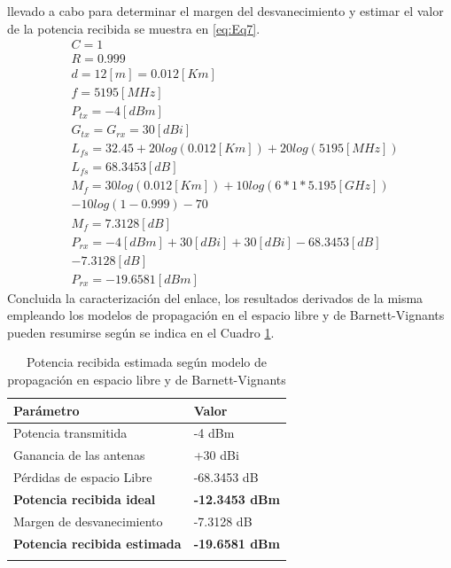 \documentclass[conference]{IEEEtran}
\begin{document}
llevado a cabo para determinar el margen del desvanecimiento y estimar el valor de la potencia recibida se muestra en \ref{eq:Eq7}.
\begin{equation}
    \label{eq:Eq7}
    \begin{aligned}
        &C = 1\\
        &R = 0.999\\
        &d = 12[m] = 0.012[Km]\\
        &f = 5195[MHz]\\
        &P_{tx} = -4[dBm]\\
        &G_{tx} = G_{rx} = 30[dBi]\\
        &L_{fs} = 32.45+20log(0.012[Km])+20log(5195[MHz])\\
        &L_{fs} = 68.3453[dB]\\
        &M_{f} = 30log(0.012[Km]) + 10log(6*1*5.195[GHz])\\
        & - 10log(1-0.999) - 70\\
        &M_{f} = 7.3128[dB]\\
        &P_{rx} = -4[dBm] + 30[dBi] + 30[dBi] - 68.3453[dB]\\
        & - 7.3128[dB]\\
        &P_{rx} = -19.6581[dBm]
    \end{aligned}
\end{equation}
Concluida la caracterización del enlace, los resultados derivados de la misma empleando los modelos de 
propagación en el espacio libre y de Barnett-Vignants pueden resumirse según se indica en el Cuadro \ref{Cuadro:2}.
\begin{table}[!hbt]
    \begin{center}
        \begin{tabular}{ l  l }
            \hline
            \hline
            \textbf{Parámetro} & \textbf{Valor}\\
            \hline
            Potencia transmitida & -4 dBm \\
            Ganancia de las antenas & +30 dBi\\
            Pérdidas de espacio Libre & -68.3453 dB \\
            \textbf{Potencia recibida ideal} & \textbf{-12.3453 dBm} \\
            Margen de desvanecimiento & -7.3128 dB \\
            \textbf{Potencia recibida estimada}  & \textbf{-19.6581 dBm}\\
            \hline
            \hline\\
        \end{tabular}
    \caption[]{Potencia recibida estimada según modelo de propagación en espacio libre y de Barnett-Vignants}
    \label{Cuadro:2}
    \end{center}
\end{table}
\end{document}
